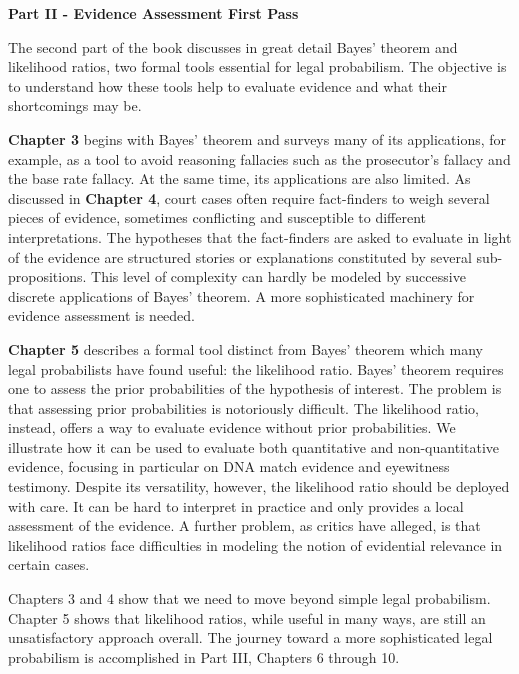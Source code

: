 \documentclass[
  10pt,
  dvipsnames,enabledeprecatedfontcommands]{scrartcl}
\begin{document}
\vspace{3mm}

\noindent \textbf{Part II - Evidence Assessment First Pass}

\noindent The second part of the book discusses in great detail Bayes'
theorem and likelihood ratios, two formal tools essential for legal
probabilism. The objective is to understand how these tools help to
evaluate evidence and what their shortcomings may be.

\textbf{Chapter 3} begins with Bayes' theorem and surveys many of its
applications, for example, as a tool to avoid reasoning fallacies such
as the prosecutor's fallacy and the base rate fallacy. At the same time,
its applications are also limited. As discussed in \textbf{Chapter 4},
court cases often require fact-finders to weigh several pieces of
evidence, sometimes conflicting and susceptible to different
interpretations. The hypotheses that the fact-finders are asked to
evaluate in light of the evidence are structured stories or explanations
constituted by several sub-propositions. This level of complexity can
hardly be modeled by successive discrete applications of Bayes' theorem.
A more sophisticated machinery for evidence assessment is needed.

\textbf{Chapter 5} describes a formal tool distinct from Bayes' theorem
which many legal probabilists have found useful: the likelihood ratio.
Bayes' theorem requires one to assess the prior probabilities of the
hypothesis of interest. The problem is that assessing prior
probabilities is notoriously difficult. The likelihood ratio, instead,
offers a way to evaluate evidence without prior probabilities. We
illustrate how it can be used to evaluate both quantitative and
non-quantitative evidence, focusing in particular on DNA match evidence
and eyewitness testimony. Despite its versatility, however, the
likelihood ratio should be deployed with care. It can be hard to
interpret in practice and only provides a local assessment of the
evidence. A further problem, as critics have alleged, is that likelihood
ratios face difficulties in modeling the notion of evidential relevance
in certain cases.

Chapters 3 and 4 show that we need to move beyond simple legal
probabilism. Chapter 5 shows that likelihood ratios, while useful in
many ways, are still an unsatisfactory approach overall. The journey
toward a more sophisticated legal probabilism is accomplished in Part
III, Chapters 6 through 10.

\vspace{3mm}
\end{document}
